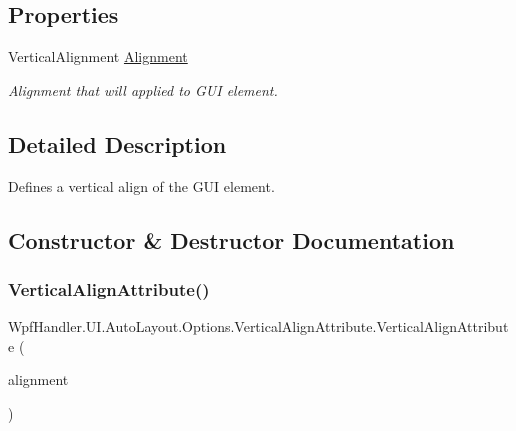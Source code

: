 \subsection*{Properties}
\begin{DoxyCompactItemize}
\item 
Vertical\+Alignment \mbox{\hyperlink{class_wpf_handler_1_1_u_i_1_1_auto_layout_1_1_options_1_1_vertical_align_attribute_a71a12b8962ff5c070830d42c1909ff75}{Alignment}}
\begin{DoxyCompactList}\small\item\em Alignment that will applied to G\+UI element. \end{DoxyCompactList}\end{DoxyCompactItemize}


\subsection{Detailed Description}
Defines a vertical align of the G\+UI element. 



\subsection{Constructor \& Destructor Documentation}
\mbox{\label{class_wpf_handler_1_1_u_i_1_1_auto_layout_1_1_options_1_1_vertical_align_attribute_a3551a6479b74c809c75c208d49967ce0}} 
\subsubsection{\texorpdfstring{Vertical\+Align\+Attribute()}{VerticalAlignAttribute()}}
{\footnotesize\ttfamily Wpf\+Handler.\+U\+I.\+Auto\+Layout.\+Options.\+Vertical\+Align\+Attribute.\+Vertical\+Align\+Attribute (\begin{DoxyParamCaption}\item[{Vertical\+Alignment}]{alignment }\end{DoxyParamCaption})}



